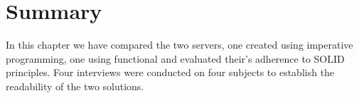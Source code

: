 \section{Summary}\label{resultsummary}

In this chapter we have compared the two servers, one created using imperative
programming, one using functional and evaluated their's adherence to SOLID
principles. Four interviews were conducted on four subjects to establish the
readability of the two solutions. 
